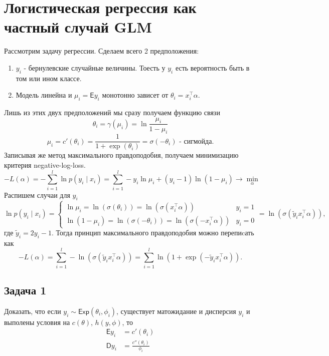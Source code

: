 \section*{Логистическая регрессия как частный случай GLM}
Рассмотрим задачу регрессии. Сделаем всего 2 предположения:
\begin{enumerate}
  \item $y_i$ - бернулевские случайные величины. Тоесть у $y_i$ есть вероятность быть в том или ином классе.
  \item Модель линейна и $\mu_i = \mathsf{E}y_i$ монотонно зависет от $\theta_i = x_i^\top\alpha$.
\end{enumerate}
Лишь из этих двух предположений мы сразу получаем функцию связи
$$
\theta_i = \gamma(\mu_i) = \ln\frac{\mu_i}{1-\mu_i}
$$
$$
\mu_i = c'(\theta_i) = \frac{1}{1+\exp(\theta_i)} = \sigma(-\theta_i) \text{ - сигмойда}.
$$
Записывая же метод максимального правдоподобия, получаем минимизацию критерия negative-log-loss.
$$
-L(\alpha) = -\sum_{i=1}^l \ln p(y_i \mid x_i) = \sum_{i=1}^l -y_i \ln \mu_i + (y_i - 1) \ln (1 - \mu_i) \to \min_\alpha
$$
Распишем случаи для $y_i$
$$
\ln p(y_i \mid x_i) = 
\begin{cases}
  \ln\mu_i = \ln(\sigma(\theta_i)) = \ln(\sigma(x_i^\top\alpha)) & y_i = 1\\
  \ln(1 - \mu_i) = \ln(\sigma(-\theta_i)) = \ln(\sigma(-x_i^\top\alpha)) & y_i = 0
\end{cases} = \ln(\sigma(\widetilde{y}_ix_i^\top\alpha)),
$$
где $\widetilde{y}_i = 2y_i - 1$. Тогда принцип максимального правдоподобия можно перепиcать как
$$
-L(\alpha) = \sum_{i=1}^l -\ln(\sigma(\widetilde{y}_ix_i^\top\alpha)) = 
\sum_{i=1}^l \ln(1 + \exp(-\widetilde{y}_ix_i^\top\alpha)).
$$

\subsection*{Задача 1}

Доказать, что если $y_i \sim \mathsf{Exp}(\theta_i, \phi_i)$, существует матожидание и дисперсия $y_i$ и выполены условия на $c(\theta)$, $h(y, \phi)$, то
\begin{align*}
  \mathsf{E}y_i &= c'(\theta_i)\\
  \mathsf{D}y_i &= \frac{c''(\theta_i)}{\phi_i}
\end{align*}

